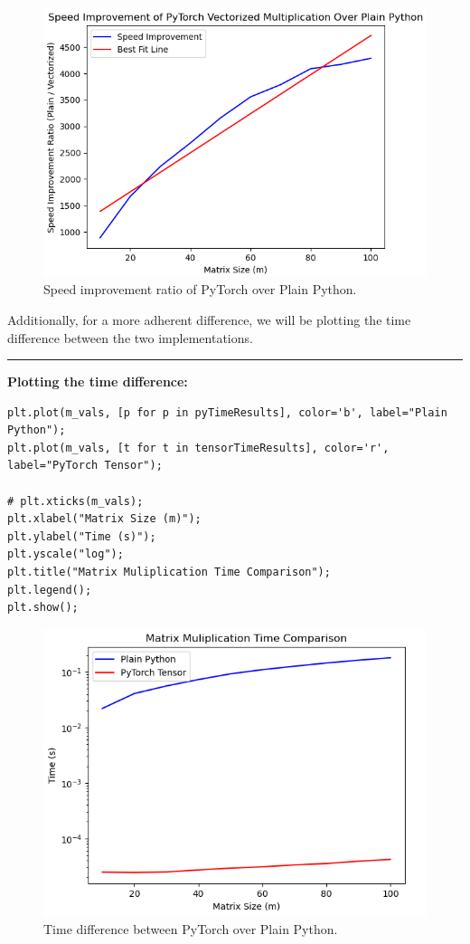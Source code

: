 \documentclass[12pt]{article}
\begin{document}
\begin{figure}[ht]
    \centering
    \includegraphics[width=1\linewidth]{PythonVSPyTorch.PNG}
    \caption{Speed improvement ratio of PyTorch over Plain Python.}
\end{figure}

\noindent Additionally, for a more adherent difference, we will be plotting the time difference between the two implementations.

\noindent\rule{\textwidth}{0.4pt}
\noindent\textbf{Plotting the time difference:}
\begin{lstlisting}
plt.plot(m_vals, [p for p in pyTimeResults], color='b', label="Plain Python");
plt.plot(m_vals, [t for t in tensorTimeResults], color='r', label="PyTorch Tensor");

# plt.xticks(m_vals);
plt.xlabel("Matrix Size (m)");
plt.ylabel("Time (s)");
plt.yscale("log");
plt.title("Matrix Muliplication Time Comparison");
plt.legend();
plt.show();
\end{lstlisting}

\begin{figure}[ht]
    \centering
    \includegraphics[width=1\linewidth]{TimeDiffPythonVsPyTorch.PNG}
    \caption{Time difference between PyTorch over Plain Python.}
\end{figure}
\end{document}
